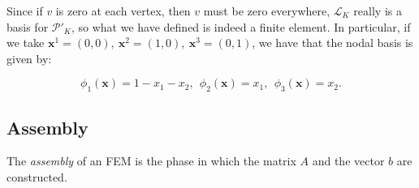 Since if $v$ is zero at each vertex, then $v$ must be zero everywhere, $\mathcal{L}_K$ really is a basis for $\mathcal{P}'_K$, so what we have defined is indeed a finite element. In particular, if we take $\boldsymbol{x}^1 = (0, 0),\ \boldsymbol{x}^2 = (1,0),\ \boldsymbol{x}^3 = (0,1)$, we have that the nodal basis is given by:

\begin{equation}
\phi_1(\boldsymbol{x}) = 1 - x_1 - x_2,\ \ \phi_2(\boldsymbol{x}) = x_1,\ \ \phi_3(\boldsymbol{x}) = x_2.
\end{equation}





\subsection{Assembly}
\label{sec:bkg:assembly}
The {\em assembly} of an FEM is the phase in which the matrix $A$ and the vector $b$ are constructed. 

